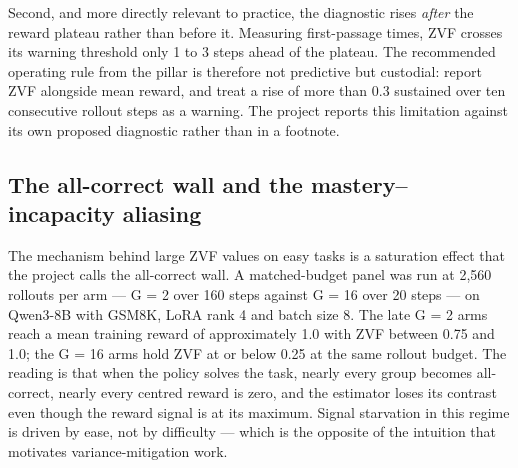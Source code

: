 \documentclass[12pt,a4paper]{report}
\begin{document}
Second, and more directly relevant to practice, the diagnostic rises
\emph{after} the reward plateau rather than before it. Measuring
first-passage times, ZVF crosses its warning threshold only 1 to 3 steps
ahead of the plateau. The recommended operating rule from the pillar is
therefore not predictive but custodial: report ZVF alongside mean
reward, and treat a rise of more than 0.3 sustained over ten consecutive
rollout steps as a warning. The project reports this limitation against
its own proposed diagnostic rather than in a footnote.

\subsection{The all-correct wall and the mastery--incapacity
aliasing}\label{the-all-correct-wall-and-the-masteryincapacity-aliasing}

The mechanism behind large ZVF values on easy tasks is a saturation
effect that the project calls the all-correct wall. A matched-budget
panel was run at 2,560 rollouts per arm --- G = 2 over 160 steps against
G = 16 over 20 steps --- on Qwen3-8B with GSM8K, LoRA rank 4 and batch
size 8. The late G = 2 arms reach a mean training reward of
approximately 1.0 with ZVF between 0.75 and 1.0; the G = 16 arms hold
ZVF at or below 0.25 at the same rollout budget. The reading is that
when the policy solves the task, nearly every group becomes all-correct,
nearly every centred reward is zero, and the estimator loses its
contrast even though the reward signal is at its maximum. Signal
starvation in this regime is driven by ease, not by difficulty --- which
is the opposite of the intuition that motivates variance-mitigation
work.
\end{document}
